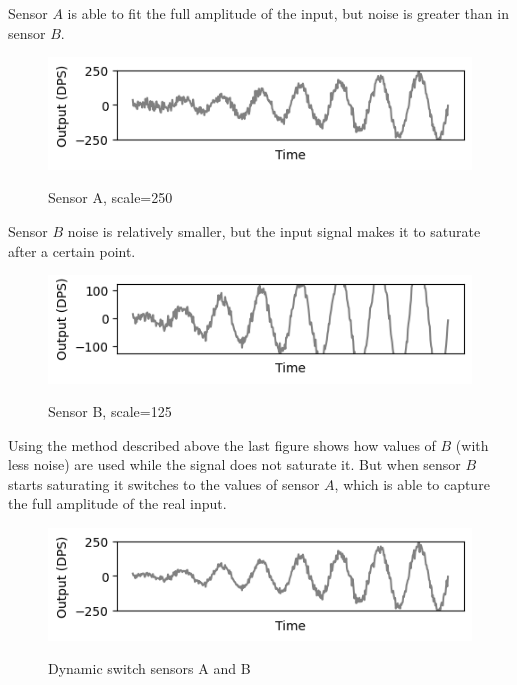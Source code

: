 \documentclass[10pt, twocolumn, a4paper]{article}
\begin{document}
        Sensor $A$ is able to fit the full amplitude of the input, but noise is greater than in sensor $B$.
        \begin{figure}[H]
            \caption{Sensor A, scale=250}
            \includegraphics[width=\linewidth]{multiple_ars/figure_scale_2.png}
            \label{fig_scale_2}
        \end{figure}
        \vspace{-8mm}

        Sensor $B$ noise is relatively smaller, but the input signal makes it to saturate after a certain point.
        \begin{figure}[H]
            \caption{Sensor B, scale=125}
            \includegraphics[width=\linewidth]{multiple_ars/figure_scale_3.png}
            \label{fig_scale_3}
        \end{figure}
        \vspace{-8mm}

        Using the method described above the last figure shows how values of $B$ (with less noise) are used while the signal does not saturate it. But when sensor $B$ starts saturating it switches to the values of sensor $A$, which is able to capture the full amplitude of the real input.
        \begin{figure}[H]
            \caption{Dynamic switch sensors A and B}
            \includegraphics[width=\linewidth]{multiple_ars/figure_scale_4.png}
            \label{fig_scale_4}
        \end{figure}
        \vspace{-8mm}
\end{document}
